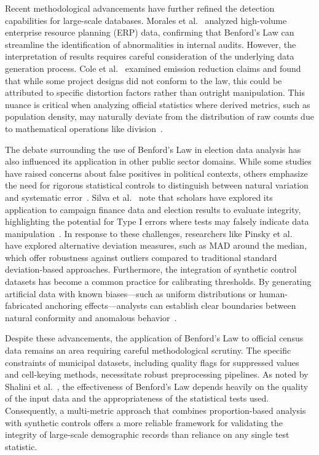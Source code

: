 \documentclass[11pt,a4paper]{article}
\begin{document}
Recent methodological advancements have further refined the detection capabilities for large-scale databases. Morales et al.~\cite{Morales2022BenfordsLF} analyzed high-volume enterprise resource planning (ERP) data, confirming that Benford's Law can streamline the identification of abnormalities in internal audits. However, the interpretation of results requires careful consideration of the underlying data generation process. Cole et al.~\cite{Cole2019TestingTE} examined emission reduction claims and found that while some project designs did not conform to the law, this could be attributed to specific distortion factors rather than outright manipulation. This nuance is critical when analyzing official statistics where derived metrics, such as population density, may naturally deviate from the distribution of raw counts due to mathematical operations like division~\cite{Druica2018BenfordsLA}.

The debate surrounding the use of Benford's Law in election data analysis has also influenced its application in other public sector domains. While some studies have raised concerns about false positives in political contexts, others emphasize the need for rigorous statistical controls to distinguish between natural variation and systematic error~\cite{Schumm2023CanRS}. Silva et al.~\cite{Silva2024ANA} note that scholars have explored its application to campaign finance data and election results to evaluate integrity, highlighting the potential for Type I errors where tests may falsely indicate data manipulation~\cite{Cole2019TestingTE}. In response to these challenges, researchers like Pinsky et al.~\cite{Pinsky2023MADM} have explored alternative deviation measures, such as MAD around the median, which offer robustness against outliers compared to traditional standard deviation-based approaches. Furthermore, the integration of synthetic control datasets has become a common practice for calibrating thresholds. By generating artificial data with known biases---such as uniform distributions or human-fabricated anchoring effects---analysts can establish clear boundaries between natural conformity and anomalous behavior~\cite{Petras2025DetectingBL}.

Despite these advancements, the application of Benford's Law to official census data remains an area requiring careful methodological scrutiny. The specific constraints of municipal datasets, including quality flags for suppressed values and cell-keying methods, necessitate robust preprocessing pipelines. As noted by Shalini et al.~\cite{Shalini2023DataQA}, the effectiveness of Benford's Law depends heavily on the quality of the input data and the appropriateness of the statistical tests used. Consequently, a multi-metric approach that combines proportion-based analysis with synthetic controls offers a more reliable framework for validating the integrity of large-scale demographic records than reliance on any single test statistic.
\end{document}
